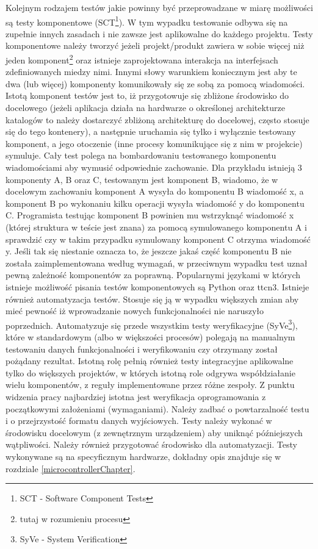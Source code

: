 \documentclass{BscUS}
\begin{document}
\indent Kolejnym rodzajem testów jakie powinny być przeprowadzane w miarę możliwości są testy komponentowe (SCT\footnote{SCT - Software Component Tests}). W tym wypadku testowanie odbywa się na zupełnie innych zasadach i nie zawsze jest aplikowalne do każdego projektu. Testy komponentowe należy tworzyć jeżeli projekt/produkt zawiera w sobie więcej niż jeden komponent\footnote{tutaj w rozumieniu procesu} oraz istnieje zaprojektowana interakcja na interfejsach zdefiniowanych miedzy nimi. Innymi słowy warunkiem koniecznym jest aby te dwa (lub więcej) komponenty komunikowały się ze sobą za pomocą wiadomości. Istotą komponent testów jest to, iż przygotowuje się zbliżone środowisko do docelowego (jeżeli aplikacja działa na hardwarze o określonej architekturze katalogów to należy dostarczyć zbliżoną architekturę do docelowej, często stosuje się do tego kontenery), a następnie uruchamia się tylko i wyłącznie testowany komponent, a jego otoczenie (inne procesy komunikujące się z nim w projekcie) symuluje. Cały test polega na bombardowaniu testowanego komponentu wiadomościami aby wymusić odpowiednie zachowanie. Dla przykładu istnieją 3 komponenty A, B oraz C, testowanym jest komponent B, wiadomo, że w docelowym zachowaniu komponent A wysyła do komponentu B wiadomość x, a komponent B po wykonaniu kilku operacji wysyła wiadomość y do komponentu C. Programista testując komponent B powinien mu wstrzyknąć wiadomość x (której struktura w teście jest znana) za pomocą symulowanego komponentu A i sprawdzić czy w takim przypadku symulowany komponent C otrzyma wiadomość y. Jeśli tak się niestanie oznacza to, że jeszcze jakaś część komponentu B nie została zaimplementowana według wymagań, w przeciwnym wypadku test uznał pewną zależność komponentów za poprawną. Popularnymi językami w których istnieje możliwość pisania testów komponentowych są Python oraz ttcn3.
\newline
\indent Istnieje również automatyzacja testów. Stosuje się ją w wypadku większych zmian aby mieć pewność iż wprowadzanie nowych funkcjonalności nie naruszyło poprzednich. Automatyzuje się przede wszystkim testy weryfikacyjne (SyVe\footnote{SyVe - System Verification}), które w standardowym (albo w większości procesów) polegają na manualnym testowaniu danych funkcjonalności i weryfikowaniu czy otrzymany został pożądany rezultat. Istotną rolę pełnią również testy integracyjne aplikowalne tylko do większych projektów, w których istotną role odgrywa współdziałanie wielu komponentów, z reguły implementowane przez różne zespoły.
\newline
\indent Z punktu widzenia pracy najbardziej istotna jest weryfikacja oprogramowania z początkowymi założeniami (wymaganiami). Należy zadbać o powtarzalność testu i o przejrzystość formatu danych wyjściowych. Testy należy wykonać w środowisku docelowym (z zewnętrznym urządzeniem) aby uniknąć późniejszych wątpliwości. Należy również przygotować środowisko dla automatyzacji. Testy wykonywane są na specyficznym hardwarze, dokładny opis znajduje się w rozdziale \ref{microcontrollerChapter}.
\end{document}
